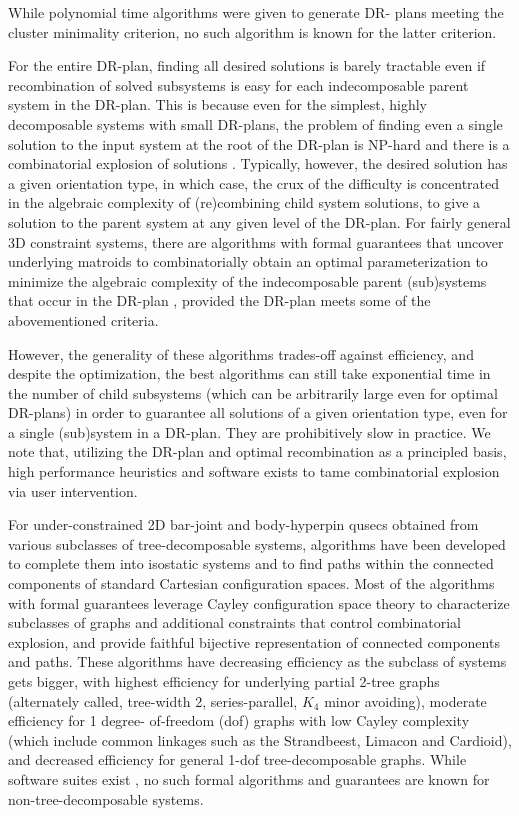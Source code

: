 While polynomial time algorithms were given \uncited to generate DR-
plans meeting the cluster minimality criterion, no such algorithm is
known for the latter criterion.


\medskip\noindent
{}
For the entire DR-plan, finding all desired solutions is barely
tractable even if recombination of solved subsystems is easy for each
indecomposable parent system in the DR-plan. This is because even for
the simplest, highly decomposable systems with small DR-plans, the
problem of finding even a single solution to the input system at the
root of the DR-plan is NP-hard \uncited and there is a combinatorial
explosion of solutions \uncited. Typically, however, the desired
solution has a given orientation type, in which case, the crux of the
difficulty is concentrated in the algebraic complexity of
(re)combining child system solutions, to give a solution to the parent
system at any given level of the DR-plan. For fairly general 3D
constraint systems, there are algorithms with formal guarantees that
uncover underlying matroids to combinatorially obtain an optimal
parameterization to minimize the algebraic complexity of the
indecomposable parent (sub)systems that occur in the DR-plan
\uncited\uncited\uncited, provided the DR-plan meets some of the
abovementioned criteria.

However, the generality of these algorithms trades-off against
efficiency, and despite the optimization, the best algorithms can
still take exponential time in the number of child subsystems (which
can be arbitrarily large even for optimal DR-plans) in order to
guarantee all solutions of a given orientation type, even for a single
(sub)system in a DR-plan. They are prohibitively slow in practice. We
note that, utilizing the DR-plan and optimal recombination as a
principled basis, high performance heuristics and software exists
\uncited\uncited to tame combinatorial explosion via user intervention.


\medskip\noindent
{}
For under-constrained 2D bar-joint and body-hyperpin qusecs obtained
from various subclasses of tree-decomposable systems, algorithms have
been developed \uncited\uncited to complete them into isostatic systems
\uncited\uncited and to find paths within the connected components
\uncited\uncited of standard Cartesian configuration spaces. Most of the
algorithms with formal guarantees leverage Cayley configuration space
theory \uncited\uncited to characterize subclasses of graphs and
additional constraints that control combinatorial explosion, and
provide faithful bijective representation of connected components and
paths. These algorithms have decreasing efficiency as the subclass of
systems gets bigger, with highest efficiency for underlying partial
2-tree graphs (alternately called, tree-width 2, series-parallel, $K_4$
minor avoiding), moderate efficiency for 1 degree- of-freedom (dof)
graphs with low Cayley complexity (which include common linkages such
as the Strandbeest, Limacon and Cardioid), and decreased efficiency
for general 1-dof tree-decomposable graphs. While software suites
exist \uncited\uncited, no such formal algorithms and guarantees are known
for non-tree-decomposable systems.
%
